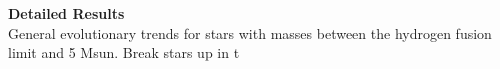 \textbf{Detailed Results} \\
General evolutionary trends for stars with masses between the hydrogen fusion limit and 5 Msun. Break stars up in t